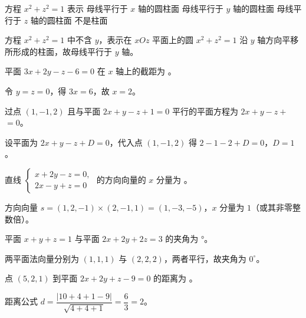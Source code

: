 \documentclass[answer]{THUExam}
\begin{document}
\begin{problem}
方程 $x^2+z^2=1$ 表示
\options
{母线平行于 $x$ 轴的圆柱面}
{母线平行于 $y$ 轴的圆柱面}
{母线平行于 $z$ 轴的圆柱面}
{不是柱面}
\end{problem}
\begin{note}
方程 $x^2+z^2=1$ 中不含 $y$，表示在 $xOz$ 平面上的圆 $x^2+z^2=1$ 沿 $y$ 轴方向平移所形成的柱面，故母线平行于 $y$ 轴。
\end{note}
\bigskip


\begin{problem}
平面 $3x+2y-z-6=0$ 在 $x$ 轴上的截距为  。
\end{problem}
\begin{note}
令 $y=z=0$，得 $3x=6$，故 $x=2$。
\end{note}
\bigskip

\begin{problem}
过点 $(1,-1,2)$ 且与平面 $2x+y-z+1=0$ 平行的平面方程为 $2x+y-z+$  $=0$。
\end{problem}
\begin{note}
设平面为 $2x+y-z+D=0$，代入点 $(1,-1,2)$ 得 $2-1-2+D=0$，$D=1$。
\end{note}
\bigskip

\begin{problem}
直线 $\left\{\begin{array}{l}x+2y-z=0,\\ 2x-y+z=0\end{array}\right.$ 的方向向量的 $x$ 分量为  。
\end{problem}
\begin{note}
方向向量 $s=(1,2,-1)\times(2,-1,1)=(1,-3,-5)$，$x$ 分量为 $1$（或其非零整数倍）。
\end{note}
\bigskip

\begin{problem}
平面 $x+y+z=1$ 与平面 $2x+2y+2z=3$ 的夹角为 °。
\end{problem}
\begin{note}
两平面法向量分别为 $(1,1,1)$ 与 $(2,2,2)$，两者平行，故夹角为 $0^\circ$。
\end{note}
\bigskip

\begin{problem}
点 $(5,2,1)$ 到平面 $2x+2y+z-9=0$ 的距离为  。
\end{problem}
\begin{note}
距离公式 $d=\dfrac{|10+4+1-9|}{\sqrt{4+4+1}}=\dfrac{6}{3}=2$。
\end{note}
\bigskip
\end{document}
